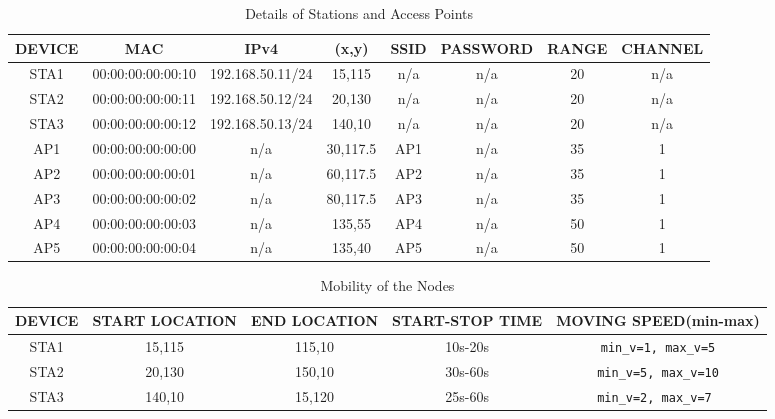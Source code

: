 \documentclass{article}
\begin{document}
\newpage
    \begin{table}[h]
        \centering
        \begin{tabular}{|c|c|c|c|c|c|c|c|}
        \hline
        DEVICE & MAC & IPv4 & (x,y) & SSID & PASSWORD & RANGE & CHANNEL\\
        \hline
        STA1 & 00:00:00:00:00:10 & 192.168.50.11/24 & 15,115 & n/a & n/a & 20 & n/a \\
        STA2 & 00:00:00:00:00:11 & 192.168.50.12/24 & 20,130 & n/a & n/a & 20 & n/a \\
        STA3 & 00:00:00:00:00:12 & 192.168.50.13/24 & 140,10 & n/a & n/a & 20 & n/a \\
        AP1 & 00:00:00:00:00:00 & n/a & 30,117.5 & AP1 & n/a & 35 & 1 \\
        AP2 & 00:00:00:00:00:01 & n/a & 60,117.5 & AP2 & n/a & 35 & 1 \\
        AP3 & 00:00:00:00:00:02 & n/a & 80,117.5 & AP3 & n/a & 35 & 1 \\
        AP4 & 00:00:00:00:00:03 & n/a & 135,55 & AP4 & n/a & 50 & 1 \\
        AP5 & 00:00:00:00:00:04 & n/a & 135,40 & AP5 & n/a & 50 & 1 \\
        \hline
        \end{tabular}
        \caption{Details of Stations and Access Points}
        \label{tab:1}
    \end{table}
    \begin{table}[h]
        \centering
        \begin{tabular}{|c|c|c|c|c|}
        \hline
        DEVICE & START LOCATION & END LOCATION & START-STOP TIME & MOVING SPEED(min-max)  \\
        \hline
        STA1 & 15,115 & 115,10 & 10s-20s & \texttt{min\_v=1, max\_v=5} \\
        STA2 & 20,130 & 150,10 & 30s-60s & \texttt{min\_v=5, max\_v=10} \\
        STA3 & 140,10 & 15,120 & 25s-60s & \texttt{min\_v=2, max\_v=7 }\\
        \hline
        \end{tabular}
        \caption{Mobility of the Nodes}
        \label{tab:2}
    \end{table}


\newpage
\end{document}

